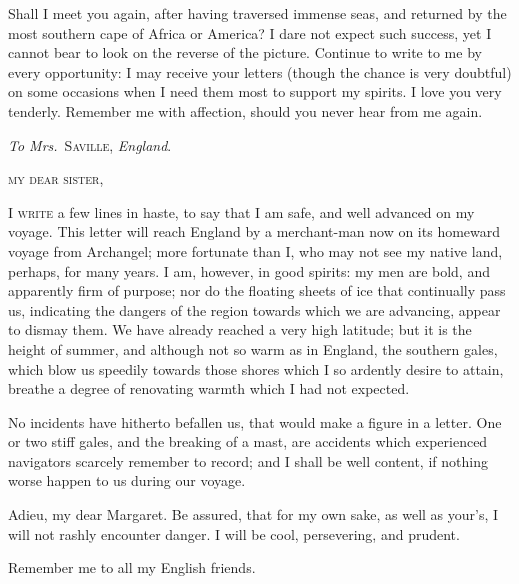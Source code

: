 Shall I meet you again, after having
traversed immense seas, and returned
by the most southern cape of Africa or
America? I dare not expect such success,
yet I cannot bear to look on the
reverse of the picture. Continue to
write to me by every opportunity: I
may receive your letters (though the
chance is very doubtful) on some occasions
when I need them most to support
my spirits. I love you very tenderly.
Remember me with affection, should
you never hear from me again.




\emph{To Mrs.}~\textsc{Saville}, \emph{England}.


\noindent\textsc{my dear sister},
\medskip

\noindent\textsc{I write} a few lines in haste, to say
that I am safe, and well advanced on
my voyage. This letter will reach
England by a merchant-man now on
its homeward voyage from Archangel;
more fortunate than I, who may not see
my native land, perhaps, for many
years. I am, however, in good spirits:
my men are bold, and apparently firm
of purpose; nor do the floating sheets
of ice that continually pass us, indicating
the dangers of the region towards
which we are advancing, appear
to dismay them. We have already
reached a very high latitude; but it is
the height of summer, and although
not so warm as in England, the southern
gales, which blow us speedily towards
those shores which I so ardently
desire to attain, breathe a degree of
renovating warmth which I had not
expected.

No incidents have hitherto befallen
us, that would make a figure in a letter.
One or two stiff gales, and the breaking
of a mast, are accidents which experienced
navigators scarcely remember
to record; and I shall be well
content, if nothing worse happen to us
during our voyage.

Adieu, my dear Margaret. Be assured,
that for my own sake, as well as
your's, I will not rashly encounter danger.
I will be cool, persevering, and
prudent.

Remember me to all my English
friends.


